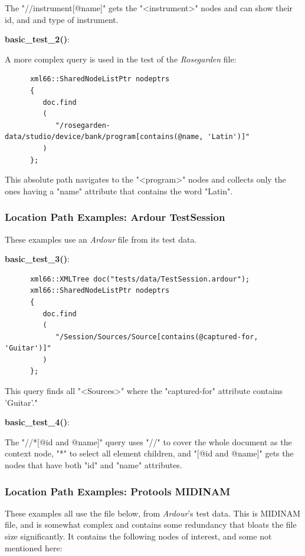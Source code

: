    The "//instrument[@name]" gets the "<instrument>" nodes and
   can show their id, and and type of instrument.

   \textbf{basic\_test\_2()}:

   A more complex query is used in the test of the
   \textsl{Rosegarden} file:

   \begin{verbatim}
      xml66::SharedNodeListPtr nodeptrs
      {
         doc.find
         (
            "/rosegarden-data/studio/device/bank/program[contains(@name, 'Latin')]"
         )
      };
   \end{verbatim}

   This absolute path navigates to the "<program>" nodes and collects
   only the ones having a "name" attribute that contains the word
   "Latin".

\subsubsection{Location Path Examples: Ardour TestSession}
\label{subsubsec:xpath_location_path_examples_2}

   These examples use an \textsl{Ardour} file from its test data.

   \textbf{basic\_test\_3()}:

   \begin{verbatim}
      xml66::XMLTree doc("tests/data/TestSession.ardour");
      xml66::SharedNodeListPtr nodeptrs
      {
         doc.find
         (
            "/Session/Sources/Source[contains(@captured-for, 'Guitar')]"
         )
      };
   \end{verbatim}

   This query finds all "<Sources>" where the "captured-for"
   attribute contains 'Guitar'."

   \textbf{basic\_test\_4()}:

   The "//*[@id and @name]" query uses "//" to cover the whole
   document as the context node, "*" to select all element children,
   and "[@id and @name]" gets the nodes that have both "id" and "name"
   attributes.

\subsubsection{Location Path Examples: Protools MIDINAM}
\label{subsubsec:xpath_location_path_examples_3}

   These examples all use the file below, from \textsl{Ardour}'s test data.
   This is MIDINAM file, and is somewhat complex and contains some
   redundancy that bloats the file size significantly.
   It contains the following nodes of interest, and some not mentioned here:


